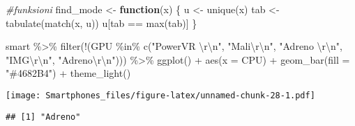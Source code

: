 \documentclass[
]{article}
\newenvironment{Shaded}{\begin{snugshade}}{\end{snugshade}}
\newcommand{\AttributeTok}[1]{\textcolor[rgb]{0.77,0.63,0.00}{#1}}
\newcommand{\CommentTok}[1]{\textcolor[rgb]{0.56,0.35,0.01}{\textit{#1}}}
\newcommand{\ControlFlowTok}[1]{\textcolor[rgb]{0.13,0.29,0.53}{\textbf{#1}}}
\newcommand{\FunctionTok}[1]{\textcolor[rgb]{0.00,0.00,0.00}{#1}}
\newcommand{\NormalTok}[1]{#1}
\newcommand{\OtherTok}[1]{\textcolor[rgb]{0.56,0.35,0.01}{#1}}
\newcommand{\SpecialCharTok}[1]{\textcolor[rgb]{0.00,0.00,0.00}{#1}}
\newcommand{\StringTok}[1]{\textcolor[rgb]{0.31,0.60,0.02}{#1}}
\begin{document}
\begin{Shaded}
\begin{Highlighting}[]
\CommentTok{\#funksioni}
\NormalTok{find\_mode }\OtherTok{\textless{}{-}} \ControlFlowTok{function}\NormalTok{(x) \{}
\NormalTok{  u }\OtherTok{\textless{}{-}} \FunctionTok{unique}\NormalTok{(x)}
\NormalTok{  tab }\OtherTok{\textless{}{-}} \FunctionTok{tabulate}\NormalTok{(}\FunctionTok{match}\NormalTok{(x, u))}
\NormalTok{  u[tab }\SpecialCharTok{==} \FunctionTok{max}\NormalTok{(tab)]}
\NormalTok{\}}

\NormalTok{smart }\SpecialCharTok{\%\textgreater{}\%}
 \FunctionTok{filter}\NormalTok{(}\SpecialCharTok{!}\NormalTok{(GPU }\SpecialCharTok{\%in\%} \FunctionTok{c}\NormalTok{(}\StringTok{"PowerVR }\SpecialCharTok{\textbackslash{}r\textbackslash{}n}\StringTok{"}\NormalTok{, }\StringTok{"Mali}\SpecialCharTok{\textbackslash{}r\textbackslash{}n}\StringTok{"}\NormalTok{, }\StringTok{"Adreno }\SpecialCharTok{\textbackslash{}r\textbackslash{}n}\StringTok{"}\NormalTok{, }\StringTok{"IMG}\SpecialCharTok{\textbackslash{}r\textbackslash{}n}\StringTok{"}\NormalTok{, }\StringTok{"Adreno}\SpecialCharTok{\textbackslash{}r\textbackslash{}n}\StringTok{"}\NormalTok{))) }\SpecialCharTok{\%\textgreater{}\%}
 \FunctionTok{ggplot}\NormalTok{() }\SpecialCharTok{+}
  \FunctionTok{aes}\NormalTok{(}\AttributeTok{x =}\NormalTok{ CPU) }\SpecialCharTok{+}
  \FunctionTok{geom\_bar}\NormalTok{(}\AttributeTok{fill =} \StringTok{"\#4682B4"}\NormalTok{) }\SpecialCharTok{+}
  \FunctionTok{theme\_light}\NormalTok{()}
\end{Highlighting}
\end{Shaded}

\texttt{[image: Smartphones\_files/figure-latex/unnamed-chunk-28-1.pdf]}

\begin{Shaded}
\end{Shaded}

\begin{verbatim}
## [1] "Adreno"
\end{verbatim}
\end{document}
